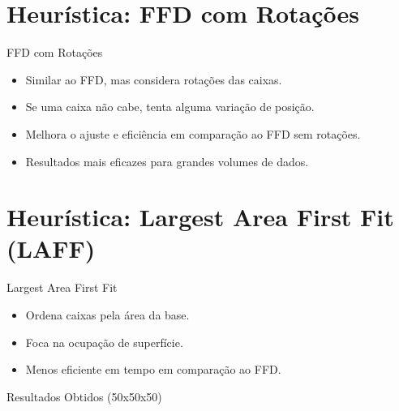 \documentclass{beamer}
\begin{document}
\section{Heurística: FFD com Rotações}
\begin{frame}{FFD com Rotações}
	\begin{itemize}
		\item Similar ao FFD, mas considera rotações das caixas.
		\item Se uma caixa não cabe, tenta alguma variação de posição.
		\item Melhora o ajuste e eficiência em comparação ao FFD sem rotações.
		\item Resultados mais eficazes para grandes volumes de dados.
	\end{itemize}
\end{frame}

\section{Heurística: Largest Area First Fit (LAFF)}
\begin{frame}{Largest Area First Fit}
	\begin{itemize}
		\item Ordena caixas pela área da base.
		\item Foca na ocupação de superfície.
		\item Menos eficiente em tempo em comparação ao FFD.
	\end{itemize}
\end{frame}

\begin{frame}{Resultados Obtidos (50x50x50)}
	\begin{table}
		\centering

		\caption{Container 50x50x50 com 30 caixas}
	\end{table}
\end{frame}
\end{document}
